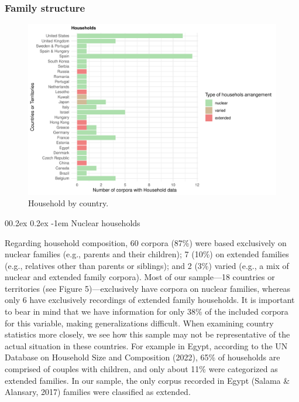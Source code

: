 \documentclass[
  man,floatsintext]{apa6}
\makeatletter
\let\oldparagraph\paragraph
\renewcommand{\paragraph}[1]{\oldparagraph{#1}\mbox{}}
\renewcommand{\paragraph}{\@startsection{paragraph}{4}{\parindent}%
  {0\baselineskip \@plus 0.2ex \@minus 0.2ex}%
  {-1em}%
  {\normalfont\normalsize\bfseries\itshape\typesectitle}}
\makeatother
\begin{document}
\hypertarget{family-structure-1}{%
\subsubsection{Family structure}\label{family-structure-1}}

\begin{figure}
\centering
\includegraphics{CHILDES_short_files/figure-latex/figure5-1.pdf}
\caption{\label{fig:figure5}Household by country.}
\end{figure}

\hypertarget{nuclear-households}{%
\paragraph{Nuclear households}\label{nuclear-households}}

Regarding household composition, 60 corpora (87\%) were based exclusively on nuclear families (e.g., parents and their children); 7 (10\%) on extended families (e.g., relatives other than parents or siblings); and 2 (3\%) varied (e.g., a mix of nuclear and extended family corpora). Most of our sample---18 countries or territories (see Figure 5)---exclusively have corpora on nuclear families, whereas only 6 have exclusively recordings of extended family households.
It is important to bear in mind that we have information for only 38\% of the included corpora for this variable, making generalizations difficult. When examining country statistics more closely, we see how this sample may not be representative of the actual situation in these countries. For example in Egypt, according to the UN Database on Household Size and Composition (2022), 65\% of households are comprised of couples with children, and only about 11\% were categorized as extended families. In our sample, the only corpus recorded in Egypt (Salama \& Alansary, 2017) families were classified as extended.
\end{document}
